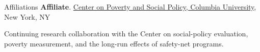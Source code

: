 \begin{rubric}{Affiliations}
\entry*[2022 - present]%
    \textbf{Affiliate}. \href{https://povertycenter.columbia.edu/people}{Center on Poverty and Social Policy, Columbia University}, New York, NY
    \par Continuing research collaboration with the Center on social-policy evaluation, poverty measurement, and the long-run effects of safety-net programs.
\end{rubric}
